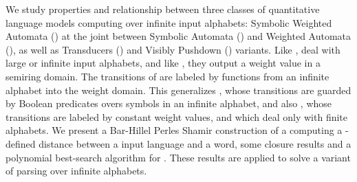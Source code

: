 %
%
We study properties and relationship between three classes of
quantitative language models computing over infinite input alphabets:
Symbolic Weighted Automata (\SWA)
at the joint between Symbolic Automata (\SA) and Weighted Automata (\WA),
as well as Transducers (\SWT) and Visibly Pushdown (\SWVPA) variants.
%
Like \SA, \SWA deal with large or infinite input alphabets,
and like \WA, they output a weight value in a semiring domain.
The transitions of \SWA are labeled by functions from an infinite alphabet into the weight domain.
This generalizes \SA, whose transitions are guarded by Boolean predicates
overs symbols in an infinite alphabet,
and also \WA, whose transitions are labeled by constant weight values,
and which deal only with finite alphabets.
%
We present a Bar-Hillel Perles Shamir construction of a \SWA
computing a \SWT-defined distance between a \SWA input language and a word, 
some closure results 
and a polynomial best-search algorithm for \SWVPA. 
These results are applied to solve a variant of parsing over infinite alphabets.
%
